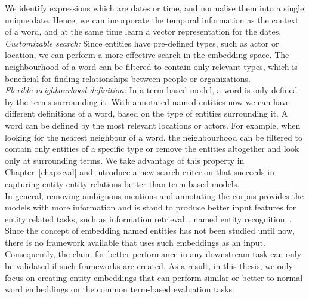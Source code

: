 We identify expressions which are dates or time, and normalise them into a single unique date. Hence, we can incorporate the temporal information as the context of a word, and at the same time learn a vector representation for the dates. \\
\emph{Customizable search:} Since entities have pre-defined types, such as actor or location, we can perform a more effective search in the embedding space. The neighbourhood of a word can be filtered to contain only relevant types, which is beneficial for finding relationships between people or organizations. \\
\emph{Flexible neighbourhood definition:} In a term-based model, a word is only defined by the terms surrounding it. With annotated named entities now we can have different definitions of a word, based on the type of entities surrounding it. A word can be defined by the most relevant locations or actors. For example, when looking for the nearest neighbour of a word, the neighbourhood can be filtered to contain only entities of a specific type or remove the entities altogether and look only at surrounding terms. We take advantage of this property in Chapter~\ref{chap:eval} and introduce a new search criterion that succeeds in capturing entity-entity relations better than term-based models. \\

In general, removing ambiguous mentions and annotating the corpus provides the models with more information and is stand to produce better input features for entity related tasks, such as information retrieval~, named entity recognition~. Since the concept of embedding named entities has not been studied until now, there is no framework available that uses such embeddings as an input. Consequently, the claim for better performance in any downstream task can only be validated if such frameworks are created. As a result, in this thesis, we only focus on creating entity embeddings that can perform similar or better to normal word embeddings on the common term-based evaluation tasks.
